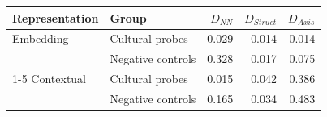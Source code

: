 \begin{tabular}{@{}llrrr@{}}
\toprule
Representation & Group & $D_{NN}$ & $D_{Struct}$ & $D_{Axis}$ \\
\midrule
Embedding & Cultural probes & 0.029 & 0.014 & 0.014 \\
 & Negative controls & 0.328 & 0.017 & 0.075 \\
\cmidrule(lr){1-5}
Contextual & Cultural probes & 0.015 & 0.042 & 0.386 \\
 & Negative controls & 0.165 & 0.034 & 0.483 \\
\bottomrule
\end{tabular}
